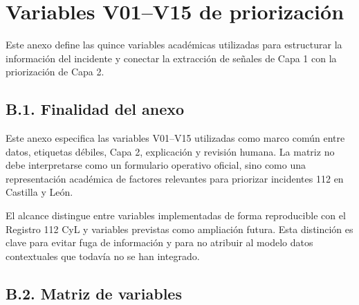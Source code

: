 \chapter{Variables V01--V15 de priorización}
\label{cap:anexob}

Este anexo define las quince variables académicas utilizadas para estructurar la información del incidente y conectar la extracción de señales de Capa 1 con la priorización de Capa 2.

\section*{B.1. Finalidad del anexo}

Este anexo especifica las variables V01--V15 utilizadas como marco común entre datos,
etiquetas débiles, Capa 2, explicación y revisión humana. La matriz no debe interpretarse
como un formulario operativo oficial, sino como una representación académica de factores
relevantes para priorizar incidentes 112 en Castilla y León.

El alcance distingue entre variables implementadas de forma reproducible con el
Registro 112 CyL y variables previstas como ampliación futura. Esta distinción es clave para evitar
fuga de información y para no atribuir al modelo datos contextuales que todavía no se
han integrado.

\section*{B.2. Matriz de variables}

